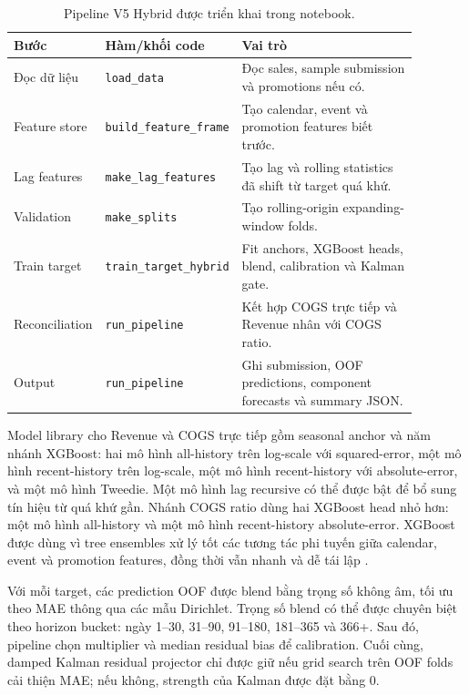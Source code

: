 \documentclass{article}
\begin{document}
\begin{table}[h]
  \centering
  \caption{Pipeline V5 Hybrid được triển khai trong notebook.}
  \label{tab:pipeline}
  \small
  \begin{tabular}{p{0.16\linewidth}p{0.27\linewidth}p{0.45\linewidth}}
    \toprule
    Bước & Hàm/khối code & Vai trò \\
    \midrule
    Đọc dữ liệu & \texttt{load\_data} &
      Đọc sales, sample submission và promotions nếu có. \\
    Feature store & \texttt{build\_feature\_frame} &
      Tạo calendar, event và promotion features biết trước. \\
    Lag features & \texttt{make\_lag\_features} &
      Tạo lag và rolling statistics đã shift từ target quá khứ. \\
    Validation & \texttt{make\_splits} &
      Tạo rolling-origin expanding-window folds. \\
    Train target & \texttt{train\_target\_hybrid} &
      Fit anchors, XGBoost heads, blend, calibration và Kalman gate. \\
    Reconciliation & \texttt{run\_pipeline} &
      Kết hợp COGS trực tiếp và Revenue nhân với COGS ratio. \\
    Output & \texttt{run\_pipeline} &
      Ghi submission, OOF predictions, component forecasts và summary JSON. \\
    \bottomrule
  \end{tabular}
\end{table}

Model library cho Revenue và COGS trực tiếp gồm seasonal anchor và năm nhánh
XGBoost: hai mô hình all-history trên log-scale với squared-error, một mô hình
recent-history trên log-scale, một mô hình recent-history với absolute-error, và
một mô hình Tweedie. Một mô hình lag recursive có thể được bật để bổ sung tín
hiệu từ quá khứ gần. Nhánh COGS ratio dùng hai XGBoost head nhỏ hơn: một mô
hình all-history và một mô hình recent-history absolute-error. XGBoost được dùng
vì tree ensembles xử lý tốt các tương tác phi tuyến giữa calendar, event và
promotion features, đồng thời vẫn nhanh và dễ tái lập \citep{xgboost}.

Với mỗi target, các prediction OOF được blend bằng trọng số không âm, tối ưu
theo MAE thông qua các mẫu Dirichlet. Trọng số blend có thể được chuyên biệt
theo horizon bucket: ngày 1--30, 31--90, 91--180, 181--365 và 366+. Sau đó,
pipeline chọn multiplier và median residual bias để calibration. Cuối cùng,
damped Kalman residual projector chỉ được giữ nếu grid search trên OOF folds cải
thiện MAE; nếu không, strength của Kalman được đặt bằng 0.
\end{document}
